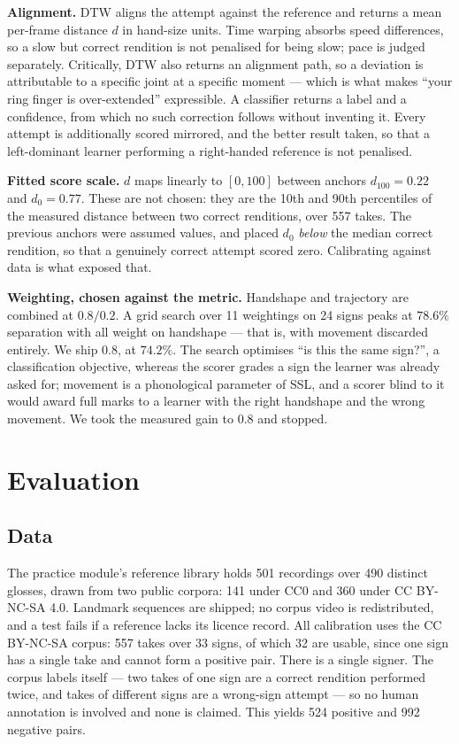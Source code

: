 \documentclass[conference]{IEEEtran}
\begin{document}
\textbf{Alignment.} DTW aligns the attempt against the reference and returns a
mean per-frame distance $d$ in hand-size units. Time warping absorbs speed
differences, so a slow but correct rendition is not penalised for being slow;
pace is judged separately. Critically, DTW also returns an alignment path, so
a deviation is attributable to a specific joint at a specific moment --- which
is what makes ``your ring finger is over-extended'' expressible. A classifier
returns a label and a confidence, from which no such correction follows
without inventing it. Every attempt is additionally scored mirrored, and the
better result taken, so that a left-dominant learner performing a
right-handed reference is not penalised.

\textbf{Fitted score scale.} $d$ maps linearly to $[0,100]$ between anchors
$d_{100}=0.22$ and $d_{0}=0.77$. These are not chosen: they are the 10th and
90th percentiles of the measured distance between two correct renditions,
over 557 takes. The previous anchors were assumed values, and placed $d_0$
\emph{below} the median correct rendition, so that a genuinely correct attempt
scored zero. Calibrating against data is what exposed that.

\textbf{Weighting, chosen against the metric.} Handshape and trajectory are
combined at $0.8/0.2$. A grid search over 11 weightings on 24 signs peaks at
$78.6\%$ separation with all weight on handshape --- that is, with movement
discarded entirely. We ship $0.8$, at $74.2\%$. The search optimises ``is this
the same sign?'', a classification objective, whereas the scorer grades a sign
the learner was already asked for; movement is a phonological parameter of
SSL, and a scorer blind to it would award full marks to a learner with the
right handshape and the wrong movement. We took the measured gain to $0.8$
and stopped.

\section{Evaluation}

\subsection{Data}
The practice module's reference library holds 501 recordings over 490 distinct
glosses, drawn from two public corpora: 141 under CC0 and 360 under
CC BY-NC-SA 4.0. Landmark sequences are shipped; no corpus video is
redistributed, and a test fails if a reference lacks its licence record. All
calibration uses the CC BY-NC-SA corpus: 557 takes over 33 signs, of which 32
are usable, since one sign has a single take and cannot form a positive pair.
There is a single signer. The corpus labels itself --- two takes of one sign
are a correct rendition performed twice, and takes of different signs are a
wrong-sign attempt --- so no human annotation is involved and none is claimed.
This yields 524 positive and 992 negative pairs.
\end{document}
